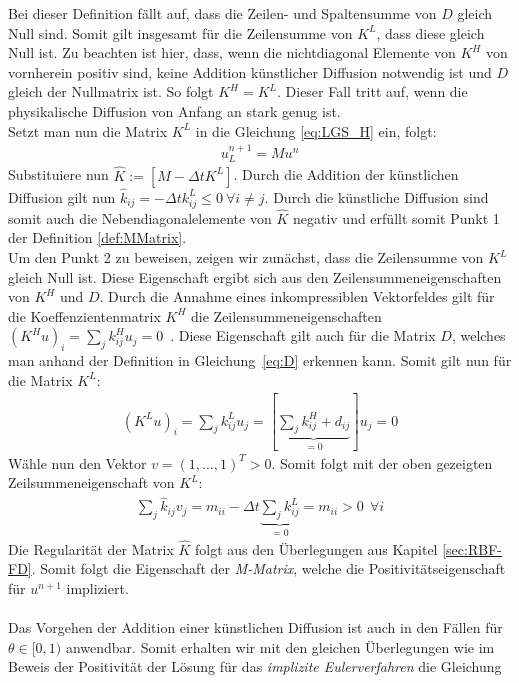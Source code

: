 \documentclass[12pt,titlepage]{article}
\begin{document}
Bei dieser Definition fällt auf, dass die Zeilen- und Spaltensumme von $D$ gleich Null sind. Somit gilt insgesamt für die Zeilensumme von $K^L$, dass diese gleich Null ist. Zu beachten ist hier, dass, wenn die nichtdiagonal Elemente von $K^H$ von vornherein positiv sind, keine Addition künstlicher Diffusion notwendig ist und $D$ gleich der Nullmatrix ist. So folgt $K^H=K^L$. Dieser Fall tritt auf, wenn die physikalische Diffusion von Anfang an stark genug ist.\\
Setzt man nun die Matrix $K^L$ in die Gleichung \eqref{eq:LGS_H} ein, folgt:
\begin{align}
 [M-\Delta tK^L]u_L^{n+1}=Mu^n
\end{align}
Substituiere nun $\widehat{K}:=[M-\Delta tK^L]$. Durch die Addition der künstlichen Diffusion gilt nun $\widehat{k}_{ij}=-\Delta tk_{ij}^L\le0~\forall i\neq j$. Durch die künstliche Diffusion sind somit auch die Nebendiagonalelemente von $\widehat{K}$ negativ und erfüllt somit Punkt 1 der Definition \ref{def:MMatrix}.\\
Um den Punkt 2 zu beweisen, zeigen wir zunächst, dass die Zeilensumme von $K^L$ gleich Null ist. Diese Eigenschaft ergibt sich aus den Zeilensummeneigenschaften von $K^H$ und $D$. Durch die Annahme eines inkompressiblen Vektorfeldes gilt für die Koeffenzientenmatrix $K^H$ die Zeilensummeneigenschaften $(K^Hu)_i=\sum_{j}k_{ij}^Hu_j=0$~\cite{kuzmin2005algebraic}. Diese Eigenschaft gilt auch für die Matrix $D$, welches man anhand der Definition in Gleichung~\eqref{eq:D} erkennen kann. Somit gilt nun für die Matrix $K^L$:
\begin{align}
 (K^Lu)_i=\sum_{j}k_{ij}^Lu_j=[\underbrace{\sum_{j}k_{ij}^H+d_{ij}}_{=0}]u_j=0
\end{align}
Wähle nun den Vektor $v=(1,\dots,1)^T>0$. Somit folgt mit der oben gezeigten Zeilsummeneigenschaft von $K^L$:
\begin{align}
 \sum_j \widehat{k}_{ij} v_j=m_{ii} - \Delta t\underbrace{\sum_j k_{ij}^L}_{=0}=m_{ii}>0~~\forall i
\end{align}
Die Regularität der Matrix $\widehat{K}$ folgt aus den Überlegungen aus Kapitel \ref{sec:RBF-FD}. Somit folgt die Eigenschaft der \textit{M-Matrix}, welche die Positivitätseigenschaft für $u^{n+1}$ impliziert.\\\\
Das Vorgehen der Addition einer künstlichen Diffusion ist auch in den Fällen für $\theta\in[0,1)$ anwendbar. Somit erhalten wir mit den gleichen Überlegungen wie im Beweis der Positivität der Lösung für das \textit{implizite Eulerverfahren} die Gleichung
\end{document}
